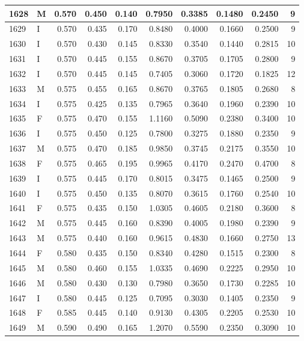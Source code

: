 \documentclass[9pt,twocolumn,twoside,]{pnas-new}
\begin{document}
\begin{tabular}{l|l|r|r|r|r|r|r|r|r}
\hline
1628 & M & 0.570 & 0.450 & 0.140 & 0.7950 & 0.3385 & 0.1480 & 0.2450 & 9\\
\hline
1629 & I & 0.570 & 0.435 & 0.170 & 0.8480 & 0.4000 & 0.1660 & 0.2500 & 9\\
\hline
1630 & I & 0.570 & 0.430 & 0.145 & 0.8330 & 0.3540 & 0.1440 & 0.2815 & 10\\
\hline
1631 & I & 0.570 & 0.445 & 0.155 & 0.8670 & 0.3705 & 0.1705 & 0.2800 & 9\\
\hline
1632 & I & 0.570 & 0.445 & 0.145 & 0.7405 & 0.3060 & 0.1720 & 0.1825 & 12\\
\hline
1633 & M & 0.575 & 0.455 & 0.165 & 0.8670 & 0.3765 & 0.1805 & 0.2680 & 8\\
\hline
1634 & I & 0.575 & 0.425 & 0.135 & 0.7965 & 0.3640 & 0.1960 & 0.2390 & 10\\
\hline
1635 & F & 0.575 & 0.470 & 0.155 & 1.1160 & 0.5090 & 0.2380 & 0.3400 & 10\\
\hline
1636 & I & 0.575 & 0.450 & 0.125 & 0.7800 & 0.3275 & 0.1880 & 0.2350 & 9\\
\hline
1637 & M & 0.575 & 0.470 & 0.185 & 0.9850 & 0.3745 & 0.2175 & 0.3550 & 10\\
\hline
1638 & F & 0.575 & 0.465 & 0.195 & 0.9965 & 0.4170 & 0.2470 & 0.4700 & 8\\
\hline
1639 & I & 0.575 & 0.445 & 0.170 & 0.8015 & 0.3475 & 0.1465 & 0.2500 & 9\\
\hline
1640 & I & 0.575 & 0.450 & 0.135 & 0.8070 & 0.3615 & 0.1760 & 0.2540 & 10\\
\hline
1641 & F & 0.575 & 0.435 & 0.150 & 1.0305 & 0.4605 & 0.2180 & 0.3600 & 8\\
\hline
1642 & M & 0.575 & 0.445 & 0.160 & 0.8390 & 0.4005 & 0.1980 & 0.2390 & 9\\
\hline
1643 & M & 0.575 & 0.440 & 0.160 & 0.9615 & 0.4830 & 0.1660 & 0.2750 & 13\\
\hline
1644 & F & 0.580 & 0.435 & 0.150 & 0.8340 & 0.4280 & 0.1515 & 0.2300 & 8\\
\hline
1645 & M & 0.580 & 0.460 & 0.155 & 1.0335 & 0.4690 & 0.2225 & 0.2950 & 10\\
\hline
1646 & M & 0.580 & 0.430 & 0.130 & 0.7980 & 0.3650 & 0.1730 & 0.2285 & 10\\
\hline
1647 & I & 0.580 & 0.445 & 0.125 & 0.7095 & 0.3030 & 0.1405 & 0.2350 & 9\\
\hline
1648 & F & 0.585 & 0.445 & 0.140 & 0.9130 & 0.4305 & 0.2205 & 0.2530 & 10\\
\hline
1649 & M & 0.590 & 0.490 & 0.165 & 1.2070 & 0.5590 & 0.2350 & 0.3090 & 10\\

\end{tabular}
\end{document}
